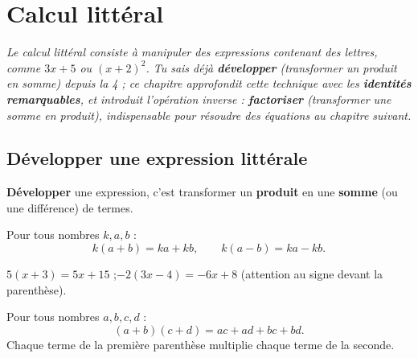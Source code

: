\chapter{Calcul littéral}

\noindent\textit{Le calcul littéral consiste à manipuler des expressions contenant des
lettres, comme $3x+5$ ou $(x+2)^2$. Tu sais déjà \textbf{développer} (transformer un produit
en somme) depuis la 4\ieme{} ; ce chapitre approfondit cette technique avec les
\textbf{identités remarquables}, et introduit l'opération inverse : \textbf{factoriser}
(transformer une somme en produit), indispensable pour résoudre des équations au chapitre
suivant.}
\vspace{8pt}

\connecteBanner

\section{Développer une expression littérale}

\begin{definition}[Développer]
\textbf{Développer} une expression, c'est transformer un \textbf{produit} en une
\textbf{somme} (ou une différence) de termes.
\end{definition}

\begin{propriete}
Pour tous nombres $k,a,b$ :
\[
k(a+b)=ka+kb, \qquad k(a-b)=ka-kb.
\]
\end{propriete}

\begin{illus}
\end{illus}

\begin{exemple}
$5(x+3)=5x+15$ ;\quad $-2(3x-4)=-6x+8$ (attention au signe devant la parenthèse).
\end{exemple}

\begin{propriete}
Pour tous nombres $a,b,c,d$ :
\[
(a+b)(c+d)=ac+ad+bc+bd.
\]
Chaque terme de la première parenthèse multiplie chaque terme de la seconde.
\end{propriete}

